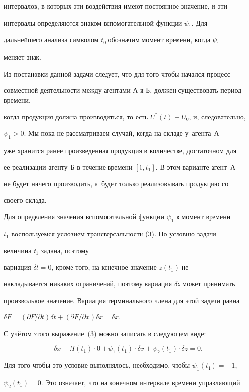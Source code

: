 интервалов, в которых эти воздействия имеют постоянное значение, и эти

интервалы определяются знаком вспомогательной функции $\psi_1$. Для

дальнейшего анализа символом $t_0$ обозначим момент времени, когда $\psi_1$

меняет знак.



Из постановки данной задачи следует, что для того чтобы начался процесс

совместной деятельности между агентами А и Б, должен существовать период времени,

когда продукция должна производиться, то есть $U^*(t)= U_0$, и, следовательно,

$\psi_1>0$. Мы пока не рассматриваем случай, когда на складе у~агента~А

уже хранится ранее произведенная продукция в количестве, достаточном для

ее реализации агенту~Б в течение времени $[0,t_1]$. В этом варианте агент~А

не будет ничего производить, а~будет только реализовывать продукцию со

своего склада.



Для определения значения вспомогательной функции $\psi_1$ в момент времени

$t_1$ воспользуемся условием трансверсальности (3). По условию задачи

величина $t_1$ задана, поэтому

вариация $\delta t=0$, кроме того, на конечное значение $z(t_1)$ не

накладывается никаких ограничений, поэтому вариация $\delta z$ может принимать

произвольное значение. Вариация терминального члена для этой задачи  равна

$\delta F=(\partial F/\partial t)\delta t+(\partial F/\partial x)\delta x=\delta x$.

 С учётом этого выражение~(3) можно записать в следующем виде:

\[

\delta x - H(t_1)\cdot 0+\psi_1(t_1)\cdot\delta x+\psi_2(t_1)\cdot\delta z = 0.

\]



Для того чтобы это условие выполнялось, необходимо, чтобы $\psi_1(t_1)=-1$,

$\psi_2(t_1)=0$. Это означает, что на конечном интервале времени управляющий

